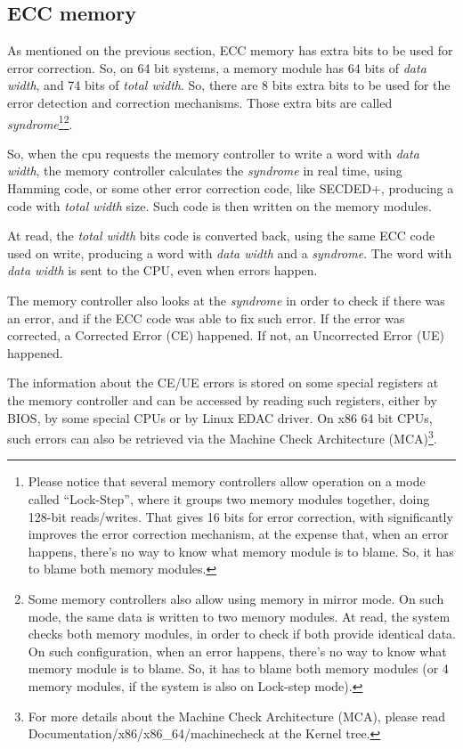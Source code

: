 \documentclass[a4paper,8pt,english]{sphinxmanual}
\begin{document}
\subsection{ECC memory}
\label{admin-guide/ras:ecc-memory}
As mentioned on the previous section, ECC memory has extra bits to be
used for error correction. So, on 64 bit systems, a memory module
has 64 bits of \emph{data width}, and 74 bits of \emph{total width}. So, there are
8 bits extra bits to be used for the error detection and correction
mechanisms. Those extra bits are called \emph{syndrome}\footnote[1]{
Please notice that several memory controllers allow operation on a
mode called ``Lock-Step'', where it groups two memory modules together,
doing 128-bit reads/writes. That gives 16 bits for error correction, with
significantly improves the error correction mechanism, at the expense
that, when an error happens, there's no way to know what memory module is
to blame. So, it has to blame both memory modules.
}\footnote[2]{
Some memory controllers also allow using memory in mirror mode.
On such mode, the same data is written to two memory modules. At read,
the system checks both memory modules, in order to check if both provide
identical data. On such configuration, when an error happens, there's no
way to know what memory module is to blame. So, it has to blame both
memory modules (or 4 memory modules, if the system is also on Lock-step
mode).
}.

So, when the cpu requests the memory controller to write a word with
\emph{data width}, the memory controller calculates the \emph{syndrome} in real time,
using Hamming code, or some other error correction code, like SECDED+,
producing a code with \emph{total width} size. Such code is then written
on the memory modules.

At read, the \emph{total width} bits code is converted back, using the same
ECC code used on write, producing a word with \emph{data width} and a \emph{syndrome}.
The word with \emph{data width} is sent to the CPU, even when errors happen.

The memory controller also looks at the \emph{syndrome} in order to check if
there was an error, and if the ECC code was able to fix such error.
If the error was corrected, a Corrected Error (CE) happened. If not, an
Uncorrected Error (UE) happened.

The information about the CE/UE errors is stored on some special registers
at the memory controller and can be accessed by reading such registers,
either by BIOS, by some special CPUs or by Linux EDAC driver. On x86 64
bit CPUs, such errors can also be retrieved via the Machine Check
Architecture (MCA)\footnote[3]{
For more details about the Machine Check Architecture (MCA),
please read Documentation/x86/x86\_64/machinecheck at the Kernel tree.
}.
\end{document}
